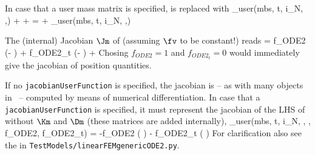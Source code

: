     In case that a user mass matrix is specified,  is replaced with
    \be
      \Mm_{user}(mbs, t, i_N, \qv,\dot \qv) \ddot \qv + \Dm \dot \qv + \Km \qv = \fv + \fv_{user}(mbs, t, i_N, \qv,\dot \qv)
    \ee

    The (internal) Jacobian $\Jm$ of  (assuming $\fv$ to be constant!) reads
    \be
      \Jm = f_{ODE2}   \left(\Km - \right) + 
            f_{ODE2_t} \left(\Dm -  \right) + 
    \ee
    Chosing $f_{ODE2} = 1$ and $f_{ODE2_t}=0$ would immediately give the jacobian of position quantities.
    
    If no \texttt{jacobianUserFunction} is specified, the jacobian is -- as with many objects in \codeName\ -- computed 
    by means of numerical differentiation.
    In case that a \texttt{jacobianUserFunction} is specified, it must represent the jacobian of the \ac{LHS} of  
    without $\Km$ and $\Dm$ (these matrices are added internally),
    \be \label{eq_ObjectGenericODE2_Jac}
      \Jm_{user}(mbs, t, i_N, \qv, \dot \qv, f_{ODE2}, f_{ODE2_t}) =
            -f_{ODE2}   \left( \right) - 
             f_{ODE2_t} \left( \right)
    \ee
    For clarification also see the  in \texttt{TestModels/linearFEMgenericODE2.py}.
    
